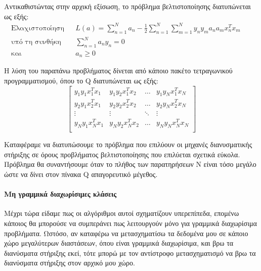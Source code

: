 	Αντικαθιστώντας στην αρχική εξίσωση, το πρόβλημα βελτιστοποίησης διατυπώνεται ως εξής:
	\begin{align}
	\text{Ελαχιστοποίηση} && L(a)= \sum_{n=1}^{N} a_n - \frac{1}{2} \sum_{n=1}^{N} \sum_{m=1}^{N} y_n y_m a_n a_m x_n^T x_m  &&\\
	\text{υπό τη συνθήκη} && \sum_{n=1}^{N} a_n y_n =0 &&\\
	\text{και} && a_n \geq 0  &&
	\end{align}
		
		Η λύση του παραπάνω προβλήματος δίνεται από κάποιο πακέτο τετραγωνικού προγραμματισμού, όπου το Q διατυπώνεται ως εξής:
		\begin{equation}
		\begin{bmatrix}
		y_1y_1x_1^Tx_1 & y_1y_2x_1^Tx_2   & \dots  &  y_1y_Nx_1^Tx_N \\
		y_2y_1x_2^Tx_1 & y_2y_2x_2^Tx_2   & \dots  &  y_2y_Nx_2^Tx_N \\
		\vdots  & \vdots &\ddots & \vdots \\
		y_Ny_1x_N^Tx_ 1& y_Ny_2x_N^Tx_2   & \dots  &  y_Ny_Nx_N^Tx_N \\
		\end{bmatrix}
		\end{equation}
		
		Καταφέραμε να διατυπώσουμε το πρόβλημα που επιλύουν οι μηχανές διανυσματικής στήριξης σε όρους προβλήματος βελτιστοποίησης που επιλύεται σχετικά εύκολα. Πρόβλημα θα συναντήσουμε όταν το πλήθος των παρατηρήσεων Ν είναι τόσο μεγάλο ώστε να δίνει στον πίνακα Q απαγορευτικό μέγεθος.
		
		
		\paragraph{Μη γραμμικά διαχωρίσιμες κλάσεις}
		Μέχρι τώρα είδαμε πως οι αλγόριθμοι αυτοί σχηματίζουν υπερεπίπεδα, επομένω κάποιος θα μπορούσε να συμπεράνει πως λειτουργούν μόνο για γραμμικά διαχωρίσιμα προβλήματα. Ωστόσο, αν καταφέρω να μετασχηματίσω τα δεδομένα μου σε κάποιο χώρο μεγαλύτερων διαστάσεων, όπου είναι γραμμικά διαχωρίσιμα, και βρω τα διανύσματα στήριξης εκεί, τότε μπορώ με τον αντίστροφο μετασχηματισμό να βρω τα διανύσματα στήριξης στον αρχικό μου χώρο.
		
